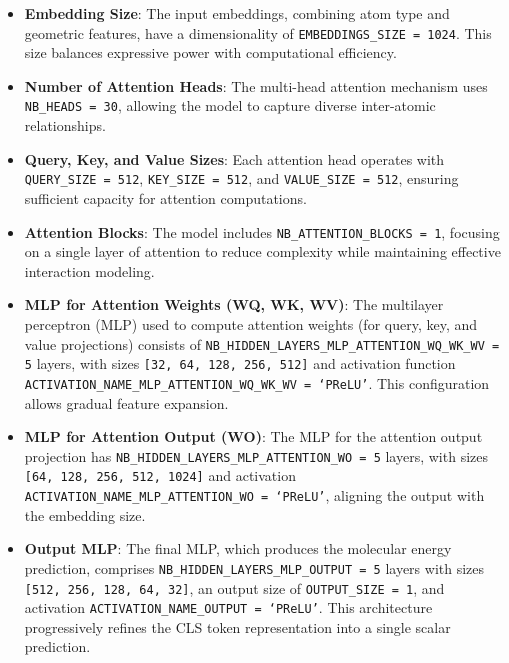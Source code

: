 \documentclass{article}
\begin{document}
\begin{itemize}
    \item \textbf{Embedding Size}: The input embeddings, combining atom type and geometric features, have a dimensionality of \texttt{EMBEDDINGS\_SIZE = 1024}. This size balances expressive power with computational efficiency.
    \vspace{0.2cm}
    \item \textbf{Number of Attention Heads}: The multi-head attention mechanism uses \texttt{NB\_HEADS = 30}, allowing the model to capture diverse inter-atomic relationships.
    \vspace{0.2cm}
    \item \textbf{Query, Key, and Value Sizes}: Each attention head operates with \texttt{QUERY\_SIZE = 512}, \texttt{KEY\_SIZE = 512}, and \texttt{VALUE\_SIZE = 512}, ensuring sufficient capacity for attention computations.
    \vspace{0.2cm}
    \item \textbf{Attention Blocks}: The model includes \texttt{NB\_ATTENTION\_BLOCKS = 1}, focusing on a single layer of attention to reduce complexity while maintaining effective interaction modeling.
    \vspace{0.2cm}
    \item \textbf{MLP for Attention Weights (WQ, WK, WV)}: The multilayer perceptron (MLP) used to compute attention weights (for query, key, and value projections) consists of \texttt{NB\_HIDDEN\_LAYERS\_MLP\_ATTENTION\_WQ\_WK\_WV = 5} layers, with sizes \texttt{[32, 64, 128, 256, 512]} and activation function \texttt{ACTIVATION\_NAME\_MLP\_ATTENTION\_WQ\_WK\_WV = `PReLU'}. This configuration allows gradual feature expansion.
    \vspace{0.2cm}
    \item \textbf{MLP for Attention Output (WO)}: The MLP for the attention output projection has \texttt{NB\_HIDDEN\_LAYERS\_MLP\_ATTENTION\_WO = 5} layers, with sizes \texttt{[64, 128, 256, 512, 1024]} and activation \texttt{ACTIVATION\_NAME\_MLP\_ATTENTION\_WO = `PReLU'}, aligning the output with the embedding size.
    \vspace{0.2cm}
    \item \textbf{Output MLP}: The final MLP, which produces the molecular energy prediction, comprises \texttt{NB\_HIDDEN\_LAYERS\_MLP\_OUTPUT = 5} layers with sizes \texttt{[512, 256, 128, 64, 32]}, an output size of \texttt{OUTPUT\_SIZE = 1}, and activation \texttt{ACTIVATION\_NAME\_OUTPUT = `PReLU'}. This architecture progressively refines the CLS token representation into a single scalar prediction.
\end{itemize}
\vspace{0.2cm}
\end{document}
